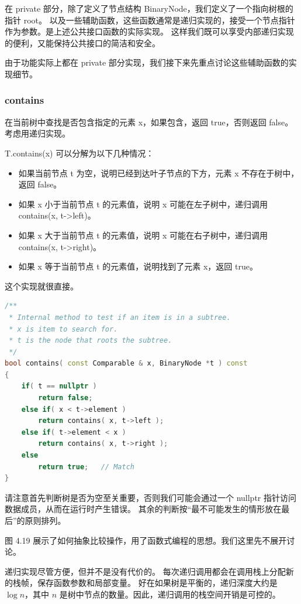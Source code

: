 \documentclass[a4paper]{ctexart}
\theoremstyle{definition}
\theoremstyle{definition}
\begin{document}
在 private 部分，除了定义了节点结构 BinaryNode，我们定义了一个指向树根的指针 root。
以及一些辅助函数，这些函数通常是递归实现的，接受一个节点指针作为参数。是上述公共接口函数的实际实现。
这样我们既可以享受内部递归实现的便利，又能保持公共接口的简洁和安全。

由于功能实际上都在 private 部分实现，我们接下来先重点讨论这些辅助函数的实现细节。

\subsubsection*{contains} 

在当前树中查找是否包含指定的元素 x，如果包含，返回 true，否则返回 false。
考虑用递归实现。

T.contains(x) 可以分解为以下几种情况：
\begin{itemize}
\item 如果当前节点 t 为空，说明已经到达叶子节点的下方，元素 x 不存在于树中，返回 false。
\item 如果 x 小于当前节点 t 的元素值，说明 x 可能在左子树中，递归调用 contains(x, t->left)。
\item 如果 x 大于当前节点 t 的元素值，说明 x 可能在右子树中，递归调用 contains(x, t->right)。
\item 如果 x 等于当前节点 t 的元素值，说明找到了元素 x，返回 true。
\end{itemize}

这个实现就很直接。

\begin{lstlisting}[language=C++]
/**
 * Internal method to test if an item is in a subtree.
 * x is item to search for.
 * t is the node that roots the subtree.
 */
bool contains( const Comparable & x, BinaryNode *t ) const
{
    if( t == nullptr )
        return false;
    else if( x < t->element )
        return contains( x, t->left );
    else if( t->element < x )
        return contains( x, t->right );
    else
        return true;   // Match
}  
\end{lstlisting}

请注意首先判断树是否为空至关重要，否则我们可能会通过一个 nullptr 指针访问数据成员，从而在运行时产生错误。
其余的判断按“最不可能发生的情形放在最后”的原则排列。

图 4.19 展示了如何抽象比较操作，用了函数式编程的思想。我们这里先不展开讨论。

递归实现尽管方便，但并不是没有代价的。 每次递归调用都会在调用栈上分配新的栈帧，保存函数参数和局部变量。
好在如果树是平衡的，递归深度大约是 $\log n$，其中 $n$ 是树中节点的数量。因此，递归调用的栈空间开销是可控的。
\end{document}
